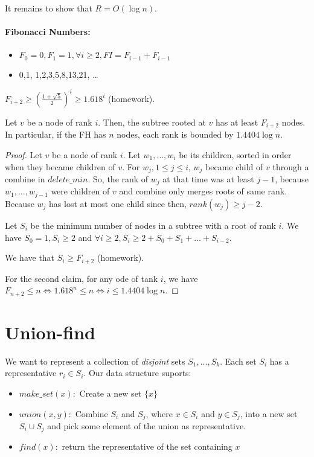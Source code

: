 It remains to show that $R = O(\log n)$.

\paragraph{Fibonacci Numbers:}
\begin{itemize}
\item $F_0 = 0, F_1 = 1, \forall i \ge 2, FI = F_{i-1} + F_{i - 1}$
\item 0,1, 1,2,3,5,8,13,21, \ldots
\end{itemize}

\begin{mylemma}
$F_{i + 2} \ge \left ( \frac{1 + \sqrt{5}}{2} \right )^i \ge 1.618^i$ (homework).
\end{mylemma}

\begin{mylemma}
Let $v$ be a node of rank $i$. Then, the subtree rooted at $v$ has at least $F_{i+2}$ nodes. In particular, if the FH has $n$ nodes, each rank is bounded by $1.4404 \log n$.
\end{mylemma}
\begin{proof}
Let $v$ be a node of rank $i$. Let $w_1, \ldots, w_i$ be its children, sorted in order when they became children of $v$. For $w_j, 1 \le j \le i$, $w_j$ became child of $v$ through a combine in ${delete\_min}$. So, the rank of $w_j$ at that time was at least $j - 1$, because $w_1, \ldots, w_{j-1}$ were children of $v$ and combine only merges roots of same rank. Because $w_j$ has lost at most one child since then, ${rank}(w_j) \ge j-2$.

Let $S_i$ be the minimum number of nodes in a subtree with a root of rank $i$. We have $S_0 = 1, S_i \ge 2$ and $\forall i \ge 2, S_i \ge 2 + S_0 + S_1 + \ldots + S_{i-2}$.

We have that $S_i \ge F_{i+2}$ (homework).

For the second claim, for any ode of tank $i$, we have $F_{n+2} \le n \iff 1.618^n \le n \iff i \le 1.4404 \log n$.
\end{proof}

\section{Union-find}

We want to represent a collection of \emph{disjoint} sets $S_1, \ldots, S_k$. Each set $S_i$ has a representative $r_i \in S_i$. Our data structure suports:

\begin{itemize}
\item ${make\_set}(x):$ Create a new set $\{x\}$
\item ${union}(x, y):$ Combine $S_i$ and $S_j$, where $x \in S_i$ and $y \in S_j$, into a new set $S_i \cup S_j$ and pick some element of the union as representative.
\item ${find}(x):$ return the representative of the set containing $x$
\end{itemize}
 
